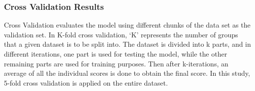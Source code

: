 \begin{table}[!ht]
\caption{Evaluation Metrics of Test Data}
\centering
{}
    \label{table: Evaluation Metrics of Test Data}
\end{table}

\pagebreak

\subsubsection{Cross Validation Results} 
Cross Validation evaluates the model using different chunks of the data set as the validation set. In K-fold cross validation, ‘K’ represents the number of groups that a given dataset is to be split into. The dataset is divided into k parts, and  in different iterations, one part is used for testing the model, while the other remaining parts are used for training purposes. Then after k-iterations, an average of all the individual scores is done to obtain the final score. In this study, 5-fold cross validation is applied on the entire dataset. 

